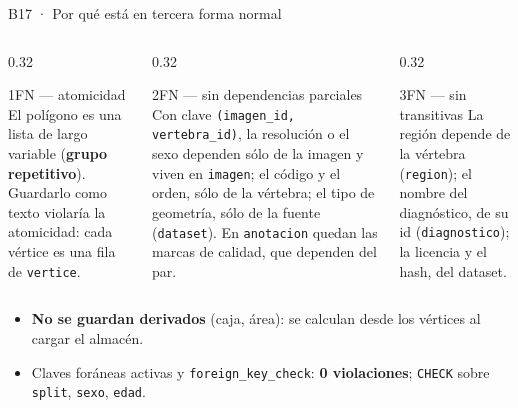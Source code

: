 \documentclass[aspectratio=169,10pt]{beamer}
\begin{document}
\begin{frame}{B17 · Por qué está en tercera forma normal}
  \begin{columns}[T]
    \begin{column}{0.32\textwidth}
      \begin{block}{1FN — atomicidad}
        \footnotesize El polígono es una lista de largo variable (\textbf{grupo repetitivo}). Guardarlo como texto violaría la atomicidad: cada vértice es una fila de \texttt{vertice}.
      \end{block}
    \end{column}
    \begin{column}{0.32\textwidth}
      \begin{block}{2FN — sin dependencias parciales}
        \footnotesize Con clave \texttt{(imagen\_id, vertebra\_id)}, la resolución o el sexo dependen sólo de la imagen y viven en \texttt{imagen}; el código y el orden, sólo de la vértebra; el tipo de geometría, sólo de la fuente (\texttt{dataset}). En \texttt{anotacion} quedan las marcas de calidad, que dependen del par.
      \end{block}
    \end{column}
    \begin{column}{0.32\textwidth}
      \begin{block}{3FN — sin transitivas}
        \footnotesize La región depende de la vértebra (\texttt{region}); el nombre del diagnóstico, de su id (\texttt{diagnostico}); la licencia y el hash, del dataset.
      \end{block}
    \end{column}
  \end{columns}
  \vspace{1.5ex}
  \small
  \begin{itemize}\setlength{\itemsep}{0.3ex}
    \item \textbf{No se guardan derivados} (caja, área): se calculan desde los vértices al cargar el almacén.
    \item Claves foráneas activas y \texttt{foreign\_key\_check}: \textbf{0 violaciones}; \texttt{CHECK} sobre \texttt{split}, \texttt{sexo}, \texttt{edad}.
  \end{itemize}
\end{frame}
\end{document}
